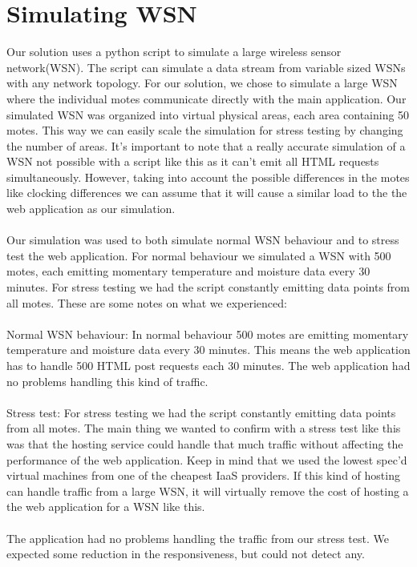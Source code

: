 \documentclass[]{uiophd}
\begin{document}
\section{Simulating WSN}
Our solution uses a python script to simulate a large wireless sensor network(WSN). The script can simulate a data stream from variable sized WSNs with any network topology. For our solution, we chose to simulate a large WSN where the individual motes communicate directly with the main application. Our simulated WSN was organized into virtual physical areas, each area containing 50 motes. This way we can easily scale the simulation for stress testing by changing the number of areas. It’s important to note that a really accurate simulation of a WSN not possible with a script like this as it can’t emit all HTML requests simultaneously. However, taking into account the possible differences in the motes like clocking differences we can assume that it will cause a similar load to the the web application as our simulation.
\\\\
Our simulation was used to both simulate normal WSN behaviour and to stress test the web application. For normal behaviour we simulated a WSN with 500 motes, each emitting momentary temperature and moisture data every 30 minutes. For stress testing we had the script constantly emitting data points from all motes. These are some notes on what we experienced:
\\\\
Normal WSN behaviour: In normal behaviour 500 motes are emitting momentary temperature and moisture data every 30 minutes. This means the web application has to handle 500 HTML post requests each 30 minutes. The web application had no problems handling this kind of traffic.
\\\\
Stress test:  For stress testing we had the script constantly emitting data points from all motes. The main thing we wanted to confirm with a stress test like this was that the hosting service could handle that much traffic without affecting the performance of the web application. Keep in mind that we used the lowest spec’d virtual machines from one of the cheapest IaaS providers. If this kind of hosting can handle traffic from a large WSN, it will virtually remove the cost of hosting a the web application for a WSN like this. 
\\\\
The application had no problems handling the traffic from our stress test. We expected some reduction in the responsiveness, but could not detect any. 
\end{document}
